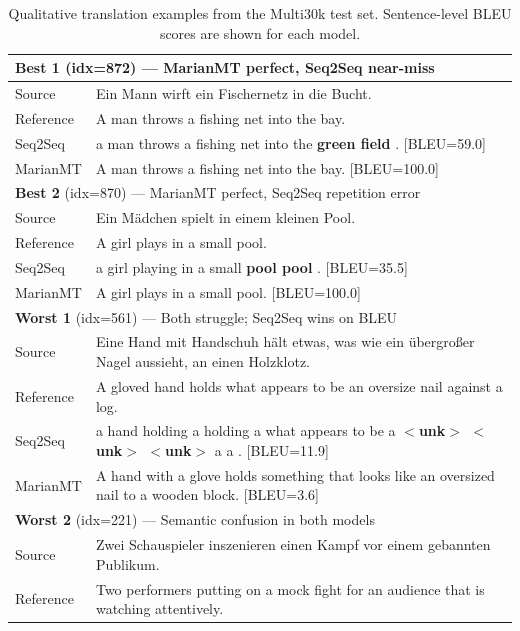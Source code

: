 \documentclass[11pt,a4paper]{article}
\begin{document}
\begin{table}[H]
\centering
\caption{Qualitative translation examples from the Multi30k test set.
Sentence-level BLEU scores are shown for each model.}
\label{tab:q4-qualitative}
\renewcommand{\arraystretch}{1.2}
\small
\begin{tabular}{p{} p{}}
\toprule
\multicolumn{2}{l}{\textbf{Best 1} (idx=872) — MarianMT perfect, Seq2Seq near-miss} \\
\midrule
Source    & Ein Mann wirft ein Fischernetz in die Bucht. \\
Reference & A man throws a fishing net into the bay. \\
Seq2Seq   & a man throws a fishing net into the \textbf{green field} . \hfill [BLEU=59.0] \\
MarianMT  & A man throws a fishing net into the bay. \hfill [BLEU=100.0] \\
\midrule
\multicolumn{2}{l}{\textbf{Best 2} (idx=870) — MarianMT perfect, Seq2Seq repetition error} \\
\midrule
Source    & Ein Mädchen spielt in einem kleinen Pool. \\
Reference & A girl plays in a small pool. \\
Seq2Seq   & a girl playing in a small \textbf{pool pool} . \hfill [BLEU=35.5] \\
MarianMT  & A girl plays in a small pool. \hfill [BLEU=100.0] \\
\midrule
\multicolumn{2}{l}{\textbf{Worst 1} (idx=561) — Both struggle; Seq2Seq wins on BLEU} \\
\midrule
Source    & Eine Hand mit Handschuh hält etwas, was wie ein übergroßer Nagel aussieht, an einen Holzklotz. \\
Reference & A gloved hand holds what appears to be an oversize nail against a log. \\
Seq2Seq   & a hand holding a holding a what appears to be a \textbf{$<$unk$>$ $<$unk$>$ $<$unk$>$} a a . \hfill [BLEU=11.9] \\
MarianMT  & A hand with a glove holds something that looks like an oversized nail to a wooden block. \hfill [BLEU=3.6] \\
\midrule
\multicolumn{2}{l}{\textbf{Worst 2} (idx=221) — Semantic confusion in both models} \\
\midrule
Source    & Zwei Schauspieler inszenieren einen Kampf vor einem gebannten Publikum. \\
Reference & Two performers putting on a mock fight for an audience that is watching attentively. \\

\end{tabular}
\end{table}
\end{document}
